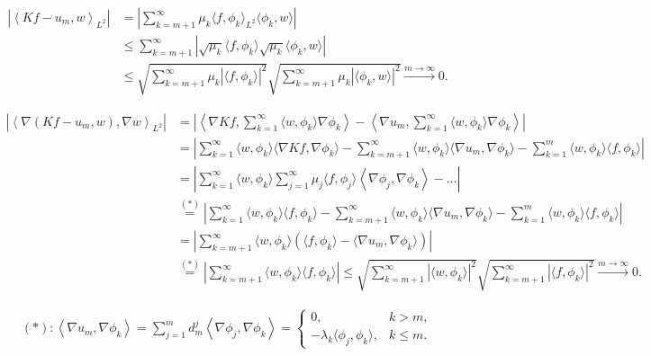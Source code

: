 \begin{solution}
  \begin{align*} %
      \left| \left\langle Kf - u_m, w \right\rangle_{L^2} \right|
      &= \left| \sum_{k = m+1}^\infty \mu_k \langle f, \phi_k\rangle_{L^2} \langle \phi_k, w \rangle \right|\\
      &\leq \sum_{k = m+1}^\infty \left| \sqrt{\mu_k} \langle f, \phi_k \rangle \sqrt{\mu_k} \langle \phi_k, w \rangle \right|\\
      &\leq \sqrt{ \sum_{k = m+1}^\infty \mu_k |\langle f, \phi_k \rangle|^2} \sqrt{ \sum_{k = m+1}^\infty \mu_k |\langle \phi_k, w \rangle|^2} \xrightarrow{m \rightarrow \infty} 0.
  \end{align*}

  \begin{align*}
      \left| \left\langle \nabla\left(Kf - u_m, w\right), \nabla w \right\rangle_{L^2} \right|
      &= \left|\left\langle \nabla Kf, \sum_{k = 1}^\infty \langle w, \phi_k\rangle \nabla \phi_k \right\rangle - \left\langle \nabla u_m, \sum_{k = 1}^\infty \langle w, \phi_k\rangle \nabla \phi_k \right\rangle \right|\\
      &= \left|\sum_{k = 1}^\infty \langle w, \phi_k\rangle \langle \nabla Kf, \nabla \phi_k\rangle - \sum_{k = m+1}^\infty \langle w, \phi_k\rangle \langle \nabla u_m, \nabla \phi_k\rangle - \sum_{k = 1}^m \langle w, \phi_k \rangle \langle f, \phi_k \rangle \right|\\
      &= \left| \sum_{k = 1}^\infty \langle w, \phi_k\rangle
      \sum_{j = 1}^\infty \mu_j \langle f, \phi_j \rangle \left\langle \nabla \phi_j, \nabla \phi_k \right\rangle
      - \hdots \right|\\
      &\stackrel{(\ast)}{=} \left| \sum_{k = 1}^\infty \langle w, \phi_k \rangle \langle f, \phi_k \rangle - \sum_{k = m+1}^\infty \langle w, \phi_k \rangle \langle \nabla u_m, \nabla \phi_k\rangle - \sum_{k = 1}^m \langle w, \phi_k \rangle \langle f, \phi_k \rangle \right|\\
      &= \left| \sum_{k = m+1}^\infty \langle w, \phi_k \rangle \left(\langle f, \phi_k \rangle - \langle \nabla u_m, \nabla \phi_k \rangle \right)\right|\\
      &\stackrel{(\ast)}{=} \left| \sum_{k = m+1}^\infty \langle w, \phi_k \rangle \langle f, \phi_k \rangle \right|
      \leq \sqrt{ \sum_{k = m+1}^\infty |\langle w, \phi_k \rangle|^2} \sqrt{ \sum_{k = m+1}^\infty |\langle f, \phi_k \rangle|^2} \xrightarrow{m \rightarrow \infty} 0.
  \end{align*}

  \begin{align*}
      (*): \left\langle \nabla u_m, \nabla \phi_k \right\rangle = \sum_{j = 1}^m d_m^j \left\langle \nabla \phi_j, \nabla \phi_k\right\rangle = \begin{cases}
          0, & k > m, \\
          - \lambda_k \langle \phi_j, \phi_k \rangle, & k \leq m.
      \end{cases}
  \end{align*}
\end{solution}

